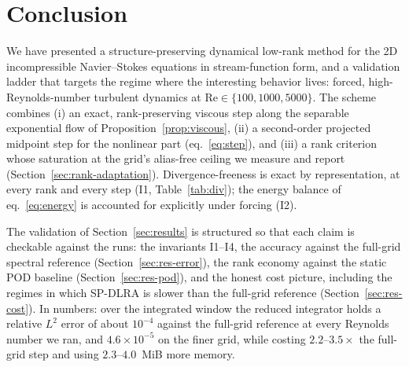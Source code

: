 
\section{Conclusion}
\label{sec:conclusion}

We have presented a structure-preserving dynamical low-rank method for the
2D incompressible Navier--Stokes equations in stream-function form, and a
validation ladder that targets the regime where the interesting behavior
lives: forced, high-Reynolds-number turbulent dynamics at
$\mathrm{Re} \in \{100, 1000, 5000\}$. The scheme combines (i) an exact,
rank-preserving viscous step along the separable exponential flow of
Proposition~\ref{prop:viscous}, (ii) a second-order projected midpoint step
for the nonlinear part (eq.~\eqref{eq:step}), and (iii) a rank criterion
whose saturation at the grid's alias-free ceiling we measure and report
(Section~\ref{sec:rank-adaptation}). Divergence-freeness is exact by
representation, at every rank and every step (I1,
Table~\ref{tab:div}); the energy balance of eq.~\eqref{eq:energy} is
accounted for explicitly under forcing (I2).

The validation of Section~\ref{sec:results} is structured so that each
claim is checkable against the runs: the invariants I1--I4, the accuracy
against the full-grid spectral reference (Section~\ref{sec:res-error}), the
rank economy against the static POD baseline (Section~\ref{sec:res-pod}),
and the honest cost picture, including the regimes in which SP-DLRA is
slower than the full-grid reference (Section~\ref{sec:res-cost}). In numbers:
over the integrated window the reduced integrator holds a relative $L^2$ error
of about $10^{-4}$ against the full-grid reference at every Reynolds number we
ran, and $4.6\times 10^{-5}$ on the finer grid, while costing $2.2$--$3.5\times$
the full-grid step and using $2.3$--$4.0$~MiB more memory.

